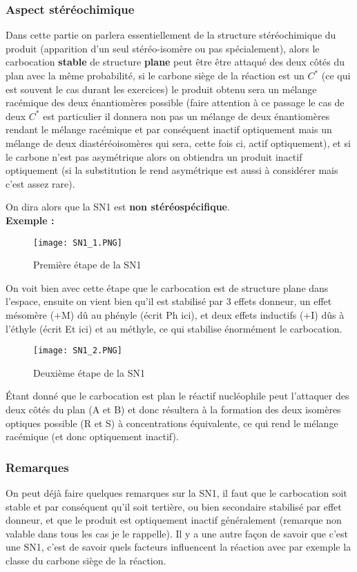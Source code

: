 \documentclass[a4paper, oneside]{book}
\begin{document}
\subsubsection{Aspect stéréochimique}
Dans cette partie on parlera essentiellement de la structure stéréochimique du produit (apparition d'un seul stéréo-isomère ou pas spécialement), alors le carbocation \textbf{stable} de structure \textbf{plane} peut être être attaqué des deux côtés du plan avec la même probabilité, si le carbone siège de la réaction est un $C^*$ (ce qui est souvent le cas durant les exercices) le produit obtenu sera un mélange racémique des deux énantiomères possible (faire attention à ce passage le cas de deux $C^*$ est particulier il donnera non pas un mélange de deux énantiomères rendant le mélange racémique et par conséquent inactif optiquement mais un mélange de deux diastéréoisomères qui sera, cette fois ci, actif optiquement), et si le carbone n'est pas asymétrique alors on obtiendra un produit inactif optiquement (si la substitution le rend asymétrique est aussi à considérer mais c'est assez rare).

On dira alors que la SN1 est \textbf{non stéréospécifique}.\\
\textbf{Exemple :}
\begin{figure}[!h]
    \centering
    \texttt{[image: SN1\_1.PNG]}
    \caption{Première étape de la SN1}
    \label{fig:my_label}
\end{figure}

On voit bien avec cette étape que le carbocation est de structure plane dans l'espace, ensuite on vient bien qu'il est stabilisé par 3 effets donneur, un effet mésomère (+M) dû au phényle (écrit Ph ici), et deux effets inductifs (+I) dûs à l'éthyle (écrit Et ici) et au méthyle, ce qui stabilise énormément le carbocation. 
\begin{figure}[!h]
    \centering
    \texttt{[image: SN1\_2.PNG]}
    \caption{Deuxième étape de la SN1}
    \label{fig:my_label}
\end{figure}
\'Etant donné que le carbocation est plan le réactif nucléophile peut l'attaquer des deux côtés du plan (A et B) et donc résultera à la formation des deux isomères optiques possible (R et S) à concentrations équivalente, ce qui rend le mélange racémique (et donc optiquement inactif).
\subsubsection{Remarques}
On peut déjà faire quelques remarques sur la SN1, il faut que le carbocation soit stable et par conséquent qu'il soit tertière, ou bien secondaire stabilisé par effet donneur, et que le produit est optiquement inactif généralement (remarque non valable dans tous les cas je le rappelle). Il y a une autre façon de savoir que c'est une SN1, c'est de savoir quels facteurs influencent la réaction avec par exemple la classe du carbone siège de la réaction.
\end{document}
